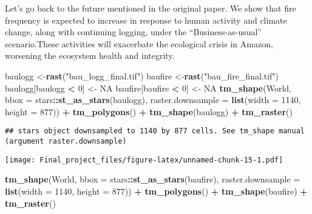 \documentclass[
]{article}
\newenvironment{Shaded}{\begin{snugshade}}{\end{snugshade}}
\newcommand{\AttributeTok}[1]{\textcolor[rgb]{0.13,0.29,0.53}{#1}}
\newcommand{\ConstantTok}[1]{\textcolor[rgb]{0.56,0.35,0.01}{#1}}
\newcommand{\DecValTok}[1]{\textcolor[rgb]{0.00,0.00,0.81}{#1}}
\newcommand{\FunctionTok}[1]{\textcolor[rgb]{0.13,0.29,0.53}{\textbf{#1}}}
\newcommand{\NormalTok}[1]{#1}
\newcommand{\OtherTok}[1]{\textcolor[rgb]{0.56,0.35,0.01}{#1}}
\newcommand{\SpecialCharTok}[1]{\textcolor[rgb]{0.81,0.36,0.00}{\textbf{#1}}}
\newcommand{\StringTok}[1]{\textcolor[rgb]{0.31,0.60,0.02}{#1}}
\begin{document}
Let's go back to the future mentioned in the original paper. We show
that fire frequency is expected to increase in response to human
activity and climate change, along with continuing logging, under the
``Business-as-usual'' scenario.These activities will exacerbate the
ecological crisis in Amazon, worsening the ecosystem health and
integrity.

\begin{Shaded}
\begin{Highlighting}[]
\NormalTok{baulogg }\OtherTok{\textless{}{-}}\FunctionTok{rast}\NormalTok{(}\StringTok{"bau\_logg\_final.tif"}\NormalTok{) }
\NormalTok{baufire }\OtherTok{\textless{}{-}}\FunctionTok{rast}\NormalTok{(}\StringTok{"bau\_fire\_final.tif"}\NormalTok{)}
\NormalTok{baulogg[baulogg }\SpecialCharTok{\textless{}} \DecValTok{0}\NormalTok{] }\OtherTok{\textless{}{-}} \ConstantTok{NA}
\NormalTok{baufire[baufire }\SpecialCharTok{\textless{}} \DecValTok{0}\NormalTok{] }\OtherTok{\textless{}{-}} \ConstantTok{NA}
\FunctionTok{tm\_shape}\NormalTok{(World, }\AttributeTok{bbox =}\NormalTok{ stars}\SpecialCharTok{::}\FunctionTok{st\_as\_stars}\NormalTok{(baulogg), }\AttributeTok{raster.downsample =} \FunctionTok{list}\NormalTok{(}\AttributeTok{width =} \DecValTok{1140}\NormalTok{, }\AttributeTok{height =} \DecValTok{877}\NormalTok{)) }\SpecialCharTok{+}
    \FunctionTok{tm\_polygons}\NormalTok{() }\SpecialCharTok{+}
    \FunctionTok{tm\_shape}\NormalTok{(baulogg) }\SpecialCharTok{+} \FunctionTok{tm\_raster}\NormalTok{()}
\end{Highlighting}
\end{Shaded}

\begin{verbatim}
## stars object downsampled to 1140 by 877 cells. See tm_shape manual (argument raster.downsample)
\end{verbatim}

\texttt{[image: Final\_project\_files/figure-latex/unnamed-chunk-15-1.pdf]}

\begin{Shaded}
\begin{Highlighting}[]
\FunctionTok{tm\_shape}\NormalTok{(World, }\AttributeTok{bbox =}\NormalTok{ stars}\SpecialCharTok{::}\FunctionTok{st\_as\_stars}\NormalTok{(baufire), }\AttributeTok{raster.downsample =} \FunctionTok{list}\NormalTok{(}\AttributeTok{width =} \DecValTok{1140}\NormalTok{, }\AttributeTok{height =} \DecValTok{877}\NormalTok{)) }\SpecialCharTok{+}
    \FunctionTok{tm\_polygons}\NormalTok{() }\SpecialCharTok{+}
    \FunctionTok{tm\_shape}\NormalTok{(baufire) }\SpecialCharTok{+} \FunctionTok{tm\_raster}\NormalTok{()}
\end{Highlighting}
\end{Shaded}
\end{document}
